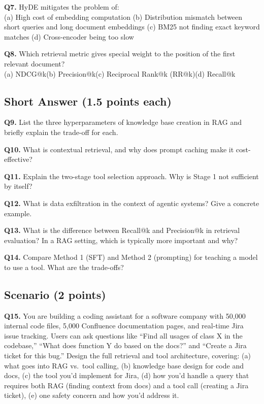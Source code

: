 \documentclass[11pt, a4paper]{article}
\begin{document}
\textbf{Q7.} HyDE mitigates the problem of:\\
(a) High cost of embedding computation\quad
(b) Distribution mismatch between short queries and long document embeddings\quad
(c) BM25 not finding exact keyword matches\quad
(d) Cross-encoder being too slow

\textbf{Q8.} Which retrieval metric gives special weight to the position of the first relevant document?\\
(a) NDCG@k\quad (b) Precision@k\quad (c) Reciprocal Rank@k (RR@k)\quad (d) Recall@k

\subsection*{Short Answer (1.5 points each)}

\textbf{Q9.} List the three hyperparameters of knowledge base creation in RAG and briefly explain the trade-off for each.

\textbf{Q10.} What is contextual retrieval, and why does prompt caching make it cost-effective?

\textbf{Q11.} Explain the two-stage tool selection approach. Why is Stage 1 not sufficient by itself?

\textbf{Q12.} What is data exfiltration in the context of agentic systems? Give a concrete example.

\textbf{Q13.} What is the difference between Recall@k and Precision@k in retrieval evaluation? In a RAG setting, which is typically more important and why?

\textbf{Q14.} Compare Method 1 (SFT) and Method 2 (prompting) for teaching a model to use a tool. What are the trade-offs?

\subsection*{Scenario (2 points)}

\textbf{Q15.} You are building a coding assistant for a software company with 50,000 internal code files, 5,000 Confluence documentation pages, and real-time Jira issue tracking. Users can ask questions like ``Find all usages of class X in the codebase,'' ``What does function Y do based on the docs?'' and ``Create a Jira ticket for this bug.'' Design the full retrieval and tool architecture, covering: (a) what goes into RAG vs.\ tool calling, (b) knowledge base design for code and docs, (c) the tool you'd implement for Jira, (d) how you'd handle a query that requires both RAG (finding context from docs) and a tool call (creating a Jira ticket), (e) one safety concern and how you'd address it.
\end{document}
